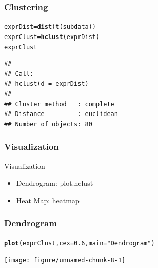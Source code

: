 \documentclass[UTF8]{beamer}\usepackage[]{graphicx}\usepackage[]{color}
\makeatletter
\newcommand{\hlnum}[1]{\textcolor[rgb]{0.686,0.059,0.569}{#1}}%
\newcommand{\hlstr}[1]{\textcolor[rgb]{0.192,0.494,0.8}{#1}}%
\newcommand{\hlstd}[1]{\textcolor[rgb]{0.345,0.345,0.345}{#1}}%
\newcommand{\hlkwb}[1]{\textcolor[rgb]{0.69,0.353,0.396}{#1}}%
\newcommand{\hlkwc}[1]{\textcolor[rgb]{0.333,0.667,0.333}{#1}}%
\newcommand{\hlkwd}[1]{\textcolor[rgb]{0.737,0.353,0.396}{\textbf{#1}}}%
\newenvironment{kframe}{%
 \def\at@end@of@kframe{}%
 \ifinner\ifhmode%
  \def\at@end@of@kframe{\end{minipage}}%
  \begin{minipage}{\columnwidth}%
 \fi\fi%
 \def\FrameCommand##1{\hskip\@totalleftmargin \hskip-\fboxsep
 \colorbox{shadecolor}{##1}\hskip-\fboxsep
     \hskip-\linewidth \hskip-\@totalleftmargin \hskip\columnwidth}%
 \MakeFramed {\advance\hsize-\width
   \@totalleftmargin\z@ \linewidth\hsize
   \@setminipage}}%
 {\par\unskip\endMakeFramed%
 \at@end@of@kframe}
\newenvironment{knitrout}{}{} %
\makeatother
\begin{document}
\begin{frame}[fragile]
  \frametitle{Clustering}
\begin{knitrout}
\color{fgcolor}\begin{kframe}
\begin{alltt}
 \hlstd{exprDist} \hlkwb{=} \hlkwd{dist}\hlstd{(}\hlkwd{t}\hlstd{(subdata))}
 \hlstd{exprClust} \hlkwb{=} \hlkwd{hclust}\hlstd{(exprDist)}
 \hlstd{exprClust}
\end{alltt}
\begin{verbatim}
## 
## Call:
## hclust(d = exprDist)
## 
## Cluster method   : complete 
## Distance         : euclidean 
## Number of objects: 80
\end{verbatim}
\end{kframe}
\end{knitrout}
\end{frame}


\begin{frame}[fragile]
  \frametitle{Visualization}
\begin{block}{Visualization}
  \begin{itemize}
  \item Dendrogram: plot.hclust
  \item Heat Map: heatmap
  \end{itemize}
\end{block}
\end{frame}

\begin{frame}[fragile]
  \frametitle{Dendrogram}

\begin{knitrout}
\color{fgcolor}\begin{kframe}
\begin{alltt}
 \hlkwd{plot}\hlstd{(exprClust,} \hlkwc{cex}\hlstd{=}\hlnum{0.6}\hlstd{,} \hlkwc{main}\hlstd{=}\hlstr{"Dendrogram"}\hlstd{)}
\end{alltt}
\end{kframe}

{\centering \texttt{[image: figure/unnamed-chunk-8-1]} 

}



\end{knitrout}
\end{frame}
\end{document}
